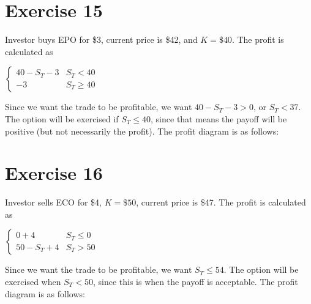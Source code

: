 \documentclass{article}
\begin{document}
\section*{Exercise 15}
Investor buys EPO for \$3, current price is \$42, and $K=\$40$. The profit is calculated as
    \begin{center}
        $\begin{cases}
            40 - S_T - 3 & S_T < 40 \\
            -3 & S_T \geq 40
        \end{cases}$
    \end{center}
Since we want the trade to be profitable, we want $40 - S_T - 3 > 0$, or $S_T < 37$. The option will be exercised if $S_T \leq 40$, since that means the payoff will be positive (but not necessarily the profit).
The profit diagram is as follows:
\begin{center}
\end{center}

\break

\section*{Exercise 16}
Investor sells ECO for \$4, $K = \$50$, current price is \$47. The profit is calculated as
\begin{center}
    $\begin{cases}
        0 + 4 & S_T \leq 0 \\
        50 - S_T + 4 & S_T > 50
    \end{cases}$
\end{center}
Since we want the trade to be profitable, we want $S_T \leq 54$. The option will be exercised when $S_T < 50$, since this is when the payoff is acceptable.
The profit diagram is as follows:
\begin{center}
\end{center}
\end{document}
